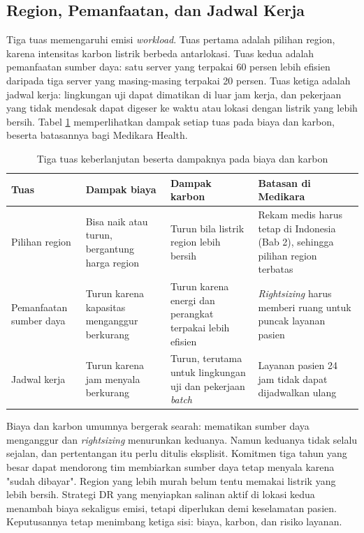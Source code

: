 \subsection{Region, Pemanfaatan, dan Jadwal Kerja}

Tiga tuas memengaruhi emisi \textit{workload}. Tuas pertama adalah pilihan region, karena intensitas
karbon listrik berbeda antarlokasi. Tuas kedua adalah pemanfaatan sumber daya: satu server yang
terpakai 60 persen lebih efisien daripada tiga server yang masing-masing terpakai 20 persen. Tuas
ketiga adalah jadwal kerja: lingkungan uji dapat dimatikan di luar jam kerja, dan pekerjaan yang
tidak mendesak dapat digeser ke waktu atau lokasi dengan listrik yang lebih bersih. Tabel
\ref{tab:ch03-tuas-karbon} memperlihatkan dampak setiap tuas pada biaya dan karbon, beserta
batasannya bagi Medikara Health.

\begin{table}[!htb]
  \centering
  \caption{Tiga tuas keberlanjutan beserta dampaknya pada biaya dan karbon}
  \label{tab:ch03-tuas-karbon}
  \footnotesize
  \begin{tabularx}{\textwidth}{>{\raggedright\arraybackslash}p{2.0cm} >{\raggedright\arraybackslash}X >{\raggedright\arraybackslash}X >{\raggedright\arraybackslash}X}
    \hline
    \textbf{Tuas} & \textbf{Dampak biaya} & \textbf{Dampak karbon} & \textbf{Batasan di Medikara} \\
      \hline
    Pilihan region & Bisa naik atau turun, bergantung harga region & Turun bila listrik region lebih
      bersih & Rekam medis harus tetap di Indonesia (Bab 2), sehingga pilihan region terbatas \\
      \hline
    Pemanfaatan sumber daya & Turun karena kapasitas menganggur berkurang & Turun karena energi dan
      perangkat terpakai lebih efisien & \textit{Rightsizing} harus memberi ruang untuk puncak
      layanan pasien \\ \hline
    Jadwal kerja & Turun karena jam menyala berkurang & Turun, terutama untuk lingkungan uji dan
      pekerjaan \textit{batch} & Layanan pasien 24 jam tidak dapat dijadwalkan ulang \\ \hline
  \end{tabularx}
\end{table}

Biaya dan karbon umumnya bergerak searah: mematikan sumber daya menganggur dan \textit{rightsizing}
menurunkan keduanya. Namun keduanya tidak selalu sejalan, dan pertentangan itu perlu ditulis
eksplisit. Komitmen tiga tahun yang besar dapat mendorong tim membiarkan sumber daya tetap menyala
karena "sudah dibayar". Region yang lebih murah belum tentu memakai listrik yang lebih bersih.
Strategi DR yang menyiapkan salinan aktif di lokasi kedua menambah biaya sekaligus emisi, tetapi
diperlukan demi keselamatan pasien. Keputusannya tetap menimbang ketiga sisi: biaya, karbon, dan
risiko layanan.

